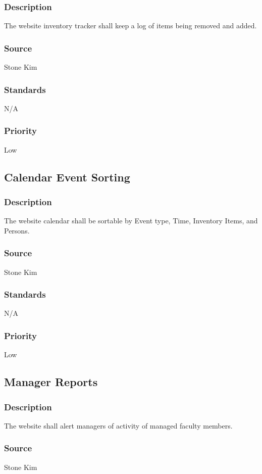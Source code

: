 \subsubsection{Description}
The website inventory tracker shall keep a log of items being removed and added.
\subsubsection{Source}
Stone Kim
\subsubsection{Standards}
N/A
\subsubsection{Priority}
Low

\subsection{Calendar Event Sorting}
\subsubsection{Description}
The website calendar shall be sortable by Event type, Time, Inventory Items, and Persons.
\subsubsection{Source}
Stone Kim
\subsubsection{Standards}
N/A
\subsubsection{Priority}
Low

\subsection{Manager Reports}
\subsubsection{Description}
The website shall alert managers of activity of managed faculty members.
\subsubsection{Source}
Stone Kim
